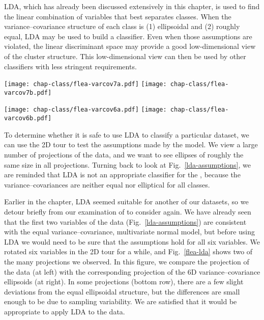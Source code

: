 LDA, which has already been discussed extensively in this chapter, is
used to find the linear combination of variables that best separates
classes.  When the variance--covariance structure of each class is (1)
ellipsoidal and (2) roughly equal, LDA may be used to build a
classifier.  Even when those assumptions are violated, the linear
discriminant space may provide a good low-dimensional view of the
cluster structure.  This low-dimensional view can then be used by
other classifiers with less stringent requirements.

\begin{figure*}[htbp]
\centerline{ {\texttt{[image: chap-class/flea-varcov7a.pdf]}}
 {\texttt{[image: chap-class/flea-varcov7b.pdf]}}}
\smallskip
\centerline{ {\texttt{[image: chap-class/flea-varcov6a.pdf]}}
 {\texttt{[image: chap-class/flea-varcov6b.pdf]}}}
\caption[Evaluating model assumptions for the 6D 
data]{Evaluating model assumptions by comparing scatterplots of the
 data {\bf (left)} with corresponding projections
of 6D normal variance--covariance ellipsoids {\bf (right)}.}
\label{flea-lda}
\end{figure*}

To determine whether it is safe to use LDA to classify a particular
dataset, we can use the 2D tour  to test the
assumptions made by the model.  We view a large number of projections
of the data, and we want to see ellipses of roughly the same size in
all projections.  Turning back to look at Fig.~\ref{lda-assumptions},
we are reminded that LDA is not an appropriate classifier for the
, because the variance--covariances are neither
equal nor elliptical for all classes.

Earlier in the chapter, LDA seemed suitable for another of our
datasets, so we detour briefly from our examination of  to consider  again.  We have already seen
that the first two variables of the  data
(Fig.~\ref{lda-assumptions}) are consistent with the equal
variance--covariance, multivariate normal model, but before using LDA
we would need to be sure that the assumptions hold for all six
variables.  We rotated six variables in the 2D tour for a while,
 and Fig.~\ref{flea-lda} shows two of the many
projections we observed.  In this figure, we compare the projection of
the data (at left) with the corresponding projection of the 6D
variance--covariance ellipsoids (at right). In some projections
(bottom row), there are a few slight deviations from the equal
ellipsoidal structure, but the differences are small enough to be due
to sampling variability.  We are satisfied that it would be
appropriate to apply LDA to the  data.

